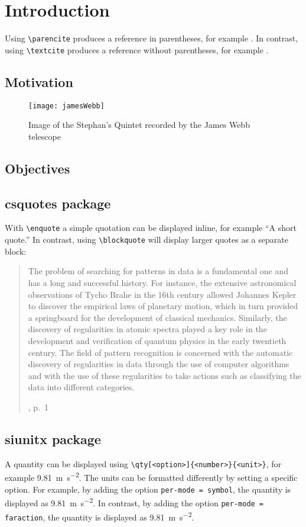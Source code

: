 \chapter{Introduction}%
\label{ch:introduction}%
Using \verb|\parencite| produces a reference in parentheses, for example \parencite{bishopPatternRecognitionMachine2006}. In contrast, using \verb|\textcite| produces a reference without parentheses, for example \textcite{rumelhartLearningRepresentationsBackpropagating1986}. 	

\lipsum%
%
\section{Motivation}%
\label{sec:motivation}%
\lipsum%
\begin{figure}
	\centering
	\texttt{[image: jamesWebb]}
	\caption[James Webb Stephan's Quintet]{Image of the Stephan's Quintet recorded by the James Webb telescope}
	\label{fig:jamesWebb}	
\end{figure}
%
\section{Objectives}%
\label{sec:objectives}%
\lipsum%
%
\section{csquotes package}%
\label{sec:csquotes}
With \verb|\enquote| a simple quotation can be displayed inline, for example \enquote{A short quote.} In contrast, using \verb|\blockquote| will display larger quotes as a separate block: \blockquote[\cite{bishopPatternRecognitionMachine2006}, p.~1]{The problem of searching for patterns in data is a fundamental one and has a long and successful history. For instance, the extensive astronomical observations of Tycho Brahe in the 16th century allowed Johannes Kepler to discover the empirical laws of planetary motion, which in turn provided a springboard for the development of classical mechanics. Similarly, the discovery of regularities in atomic spectra played a key role in the development and verification of quantum physics in the early twentieth century. The field of pattern recognition is concerned with the automatic discovery of regularities in data through the use of computer algorithms and with the use of these regularities to take actions such as classifying the data into different categories.}
%
\section{siunitx package}%
\label{sec:siunitx}
A quantity can be displayed using \verb|\qty[<option>]{<number>}{<unit>}|, for example \qty{9.81}{\meter\per\second\squared}. The units can be formatted differently by setting a specific option. For example, by adding the option \verb|per-mode = symbol|, the quantity is displayed as \qty[per-mode = symbol]{9.81}{\meter\per\second\squared}. In contrast, by adding the option \verb|per-mode = faraction|, the quantity is displayed as \qty[per-mode = fraction]{9.81}{\meter\per\second\squared}.


